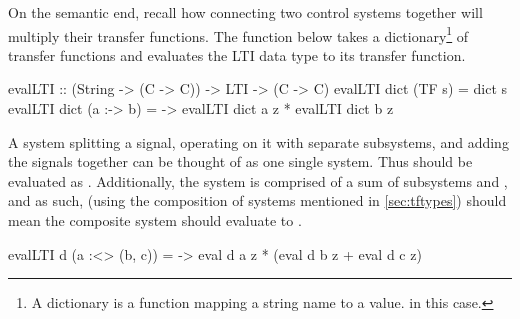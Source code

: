 On the semantic end, recall how connecting two control systems together will multiply their transfer functions. The function  below takes a dictionary\footnote{A dictionary is a function mapping a string name to a value.  in this case.} of transfer functions and evaluates the LTI data type to its transfer function.
\begin{code}
evalLTI :: (String -> (C -> C)) -> LTI -> (C -> C)
evalLTI dict (TF s) = dict s
evalLTI dict (a :-> b) = \z -> evalLTI dict a z * evalLTI dict b z
\end{code}

A system splitting a signal, operating on it with separate subsystems, and adding the signals together can be thought of as one single system. Thus  should be evaluated as . Additionally, the system is comprised of a sum of subsystems  and , and as such, (using the composition of systems mentioned in \ref{sec:tftypes})  should mean the composite system should evaluate to .
\begin{code}
evalLTI d (a :<> (b, c)) = \z -> eval d a z * (eval d b z + eval d c z)
\end{code}


